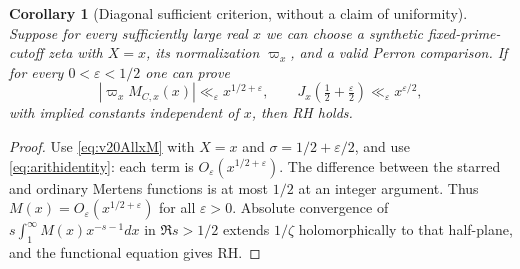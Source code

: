 \documentclass[11pt,reqno]{amsart}
\numberwithin{equation}{section}
\newtheorem{corollary}[theorem]{Corollary}
\begin{document}
\begin{corollary}[Diagonal sufficient criterion, without a claim of
uniformity]\label{cor:v20DiagonalRH}
Suppose for every sufficiently large real $x$ we can choose a
synthetic fixed-prime-cutoff zeta with $X=x$, its normalization
$\varpi_x$, and a valid Perron comparison.  If for every
$0<\varepsilon<1/2$ one can prove
\[
|\varpi_xM_{C,x}(x)|\ll_\varepsilon x^{1/2+\varepsilon},
\qquad
J_x(\tfrac12+\tfrac\varepsilon2)\ll_\varepsilon x^{\varepsilon/2},
\]
with implied constants independent of $x$, then RH holds.
\end{corollary}
\begin{proof}
Use \eqref{eq:v20AllxM} with $X=x$ and
$\sigma=1/2+\varepsilon/2$, and use
\eqref{eq:arithidentity}: each term is
$O_\varepsilon(x^{1/2+\varepsilon})$.
The difference between the starred and ordinary Mertens functions
is at most $1/2$ at an integer argument.  Thus
$M(x)=O_\varepsilon(x^{1/2+\varepsilon})$ for all $\varepsilon>0$.
Absolute convergence of
$s\int_1^\infty M(x)x^{-s-1}dx$ in $\Re s>1/2$ extends
$1/\zeta$ holomorphically to that half-plane, and the functional
equation gives RH.
\end{proof}
\end{document}

